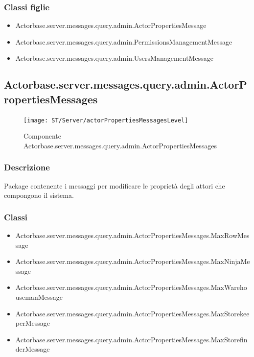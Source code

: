 \documentclass[a4paper]{article}
\begin{document}
			\subsubsection{Classi figlie}
				\begin{itemize}
					\item Actorbase.server.messages.query.admin.ActorPropertiesMessage
					\item Actorbase.server.messages.query.admin.PermissionsManagementMessage
					\item Actorbase.server.messages.query.admin.UsersManagementMessage
				\end{itemize}
		
		\subsection{Actorbase.server.messages.query.admin.ActorPropertiesMessages}
		
			\begin{figure}[H]
				\centering
				\texttt{[image: ST/Server/actorPropertiesMessagesLevel]}
				\caption{Componente Actorbase.server.messages.query.admin.ActorPropertiesMessages}
			\end{figure}
			
			\subsubsection{Descrizione}
				Package contenente i messaggi per modificare le proprietà degli attori che compongono il sistema.
				
			\subsubsection{Classi}
				\begin{itemize}
					\item Actorbase.server.messages.query.admin.ActorPropertiesMessages.MaxRowMessage
					\item Actorbase.server.messages.query.admin.ActorPropertiesMessages.MaxNinjaMessage
					\item Actorbase.server.messages.query.admin.ActorPropertiesMessages.MaxWarehousemanMessage
					\item Actorbase.server.messages.query.admin.ActorPropertiesMessages.MaxStorekeeperMessage
					\item Actorbase.server.messages.query.admin.ActorPropertiesMessages.MaxStorefinderMessage
				\end{itemize}
				
\end{document}
